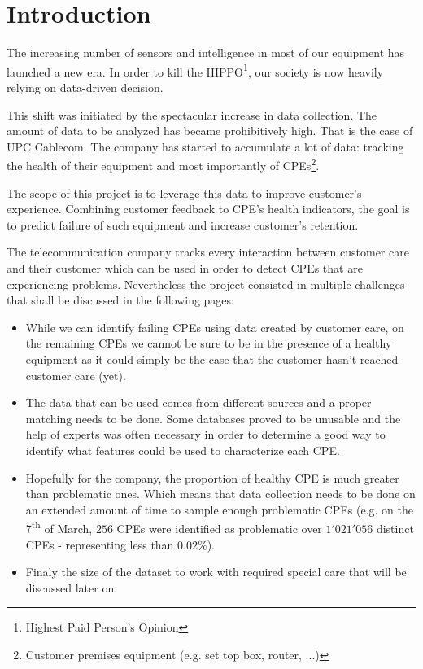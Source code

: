 
\chapter*{Introduction}
The increasing number of sensors and intelligence in most of our equipment has launched a new era. In order to kill the HIPPO\footnote{Highest Paid Person's Opinion}, our society is now heavily relying on data-driven decision. 

This shift was initiated by the spectacular increase in data collection. The amount of data to be analyzed has became prohibitively high. That is the case of UPC Cablecom. The company has started to accumulate a lot of data: tracking the health of their equipment and most importantly of CPEs\footnote{Customer premises equipment (e.g. set top box, router, ...)}. 

The scope of this project is to leverage this data to improve customer's experience. Combining customer feedback to CPE's health indicators, the goal is to predict failure of such equipment and increase customer's retention.

The telecommunication company tracks every interaction between customer care and their customer which can be used in order to detect CPEs that are experiencing problems. Nevertheless the project consisted in multiple challenges that shall be discussed in the following pages:
\begin{itemize}
    \item While we can identify failing CPEs using data created by customer care, on the remaining CPEs we cannot be sure to be in the presence of a healthy equipment as it could simply be the case that the customer hasn't reached customer care (yet). 
    \item The data that can be used comes from different sources and a proper matching needs to be done. Some databases proved to be unusable and the help of experts was often necessary in order to determine a good way to identify what features could be used to characterize each CPE. 
    \item Hopefully for the company, the proportion of healthy CPE is much greater than problematic ones. Which means that data collection needs to be done on an extended amount of time to sample enough problematic CPEs (e.g. on the 7\textsuperscript{th} of March, $256$ CPEs were identified as problematic over $1'021'056$ distinct CPEs - representing less than $0.02\%$).
    \item Finaly the size of the dataset to work with required special care that will be discussed later on. 
\end{itemize}

